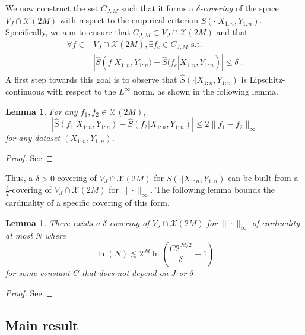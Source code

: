 \documentclass{article}
\theoremstyle{plain}
\newtheorem{lemma}[theorem]{Lemma}
\theoremstyle{definition}
\theoremstyle{remark}
\newcommand\p[1]{\left( {#1}\right)}
\begin{document}
We now construct the set $C_{J, M}$ such that it forms a \emph{$\delta$-covering} of the space $V_J \cap \mathcal{X}(2M)$ with respect to the empirical criterion $\hat{S}(\cdot | X_{1:n}, Y_{1:n})$. 
Specifically, we aim to ensure that $C_{J, M} \subset V_J \cap \mathcal{X}(2M)$ and that
\begin{equation}
\begin{aligned}
    \forall f \in &V_J \cap \mathcal{X}(2M), \exists f_c \in C_{J, M} \text{ s.t. } \\
    &| \hat{S}(f | X_{1:n}, Y_{1:n}) - \hat{S}(f_c | X_{1:n}, Y_{1:n}) | \leq \delta \;.
\end{aligned}
\end{equation}
A first step towards this goal is to observe that $\hat{S}(\cdot | X_{1:n}, Y_{1:n})$ is Lipschitz-continuous with respect to the $L^\infty$ norm, as shown in the following lemma.
\begin{lemma}
\label{lemma:from_semidual_to_infty}
    For any $f_1, f_2 \in \mathcal{X}(2M)$, 
    \begin{equation}
        \left| \hat{S}(f_1 | X_{1:n}, Y_{1:n}) - \hat{S}(f_2 | X_{1:n}, Y_{1:n}) \right| \leq 2 \| f_1 - f_2\|_{\infty}
    \end{equation}
    for any dataset $(X_{1:n}, Y_{1:n})$.
\end{lemma}
\begin{proof}
See 
\end{proof}
Thus, a $\delta >0$-covering of $V_J \cap \mathcal{X}(2M)$ for $\hat{S}(\cdot | X_{1:n}, Y_{1:n})$ can be built from a $\frac{\delta}{2}$-covering of $V_J \cap \mathcal{X}(2M)$ for $\| \cdot\|_{\infty}$. 
The following lemma bounds the cardinality of a specific covering of this form.
\begin{lemma}
\label{lemma:covering_cardinality}
    There exists a $\delta$-covering of $V_J \cap \mathcal{X}(2M)$ for $\| \cdot\|_{\infty}$ of cardinality at most $N$ where 
    \begin{equation}
        \ln(N) \lesssim 2^{Jd} \ln \p{\frac{C 2^{J d / 2} }{\delta} + 1}
    \end{equation}
    for some constant $C$ that does not depend on $J$ or $\delta$ 
\end{lemma}
\begin{proof}
See 
\end{proof}

\subsection{Main result}
\end{document}
